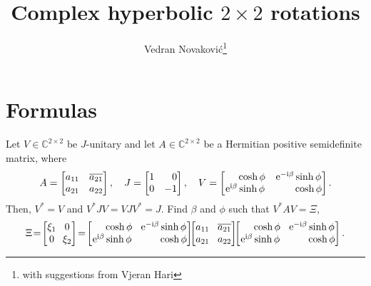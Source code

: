 \documentclass[a4paper,12pt,twoside]{article}
\title{Complex hyperbolic $2\times 2$ rotations}
\author{Vedran Novakovi\'{c}\footnote{with suggestions from Vjeran Hari}}
\begin{document}
\maketitle
\section{Formulas}
Let $V\in\mathbb{C}^{2\times 2}$ be $J$-unitary and let
$A\in\mathbb{C}^{2\times 2}$ be a Hermitian positive semidefinite
matrix, where
\begin{equation}
  A=\begin{bmatrix}
  a_{11} & \overline{a_{21}}\\
  a_{21} & a_{22}
  \end{bmatrix},\quad
  J=\begin{bmatrix}
  1 & \hphantom{-}0\\
  0 & -1
  \end{bmatrix},\quad
  V=\begin{bmatrix}
  \hphantom{\mathrm{e}^{\mathrm{i}\beta}}\cosh\phi & \mathrm{e}^{-\mathrm{i}\beta}\sinh\phi\\
  \mathrm{e}^{\mathrm{i}\beta}\sinh\phi & \hphantom{\mathrm{e}^{-\mathrm{i}\beta}}\cosh\phi
  \end{bmatrix}.
  \label{e:1}
\end{equation}
Then, $V^{\ast}=V$ and $V^{\ast}JV=VJV^{\ast}=J$.  Find $\beta$ and
$\phi$ such that $V^{\ast}AV=\Xi$,
\begin{equation}
  \Xi\!=\!\begin{bmatrix}
  \xi_1 & \!\!0\\
  0 & \!\!\xi_2
  \end{bmatrix}\!=\!\begin{bmatrix}
  \hphantom{\mathrm{e}^{\mathrm{i}\beta}}\cosh\phi & \!\mathrm{e}^{-\mathrm{i}\beta}\sinh\phi\\
  \mathrm{e}^{\mathrm{i}\beta}\sinh\phi & \!\hphantom{\mathrm{e}^{-\mathrm{i}\beta}}\cosh\phi
  \end{bmatrix}\!\!\begin{bmatrix}
  a_{11} & \!\overline{a_{21}}\\
  a_{21} & \!a_{22}
  \end{bmatrix}\!\!\begin{bmatrix}
  \hphantom{\mathrm{e}^{\mathrm{i}\beta}}\cosh\phi & \!\mathrm{e}^{-\mathrm{i}\beta}\sinh\phi\\
  \mathrm{e}^{\mathrm{i}\beta}\sinh\phi & \!\hphantom{\mathrm{e}^{-\mathrm{i}\beta}}\cosh\phi
  \end{bmatrix}.
  \label{e:2}
\end{equation}
\end{document}
